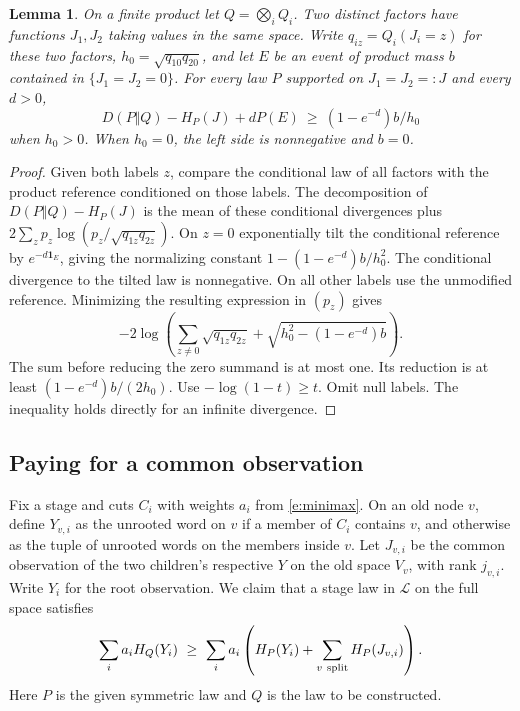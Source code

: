 \documentclass[11pt]{article}
\newtheorem{lemma}[theorem]{Lemma}
\numberwithin{equation}{section}
\newcommand{\one}{\mathbf 1}
\begin{document}
\begin{lemma}\label{l:tilt}
On a finite product let $Q=\bigotimes_i Q_i$. Two distinct factors
have functions $J_1,J_2$ taking values in the same space. Write
$q_{iz}=Q_i(J_i=z)$ for these two factors,
$h_0=\sqrt{q_{10}q_{20}}$, and let $E$ be an event of product mass
$b$ contained in $\{J_1=J_2=0\}$. For every law $P$ supported
on $J_1=J_2=:J$ and every $d>0$,
\[
 D(P\Vert Q)-H_P(J)+dP(E)
           \ \ge\ (1-e^{-d})b/h_0
\]
when $h_0>0$. When $h_0=0$, the left side is nonnegative and $b=0$.
\end{lemma}
\begin{proof}
Given both labels $z$, compare the conditional law of all factors
with the product reference conditioned on those labels. The
decomposition of $D(P\Vert Q)-H_P(J)$ is the mean of these
conditional divergences plus
$2\sum_z p_z\log(p_z/\sqrt{q_{1z}q_{2z}})$.
On $z=0$ exponentially tilt the conditional reference by
$e^{-d\one_E}$, giving the normalizing constant
$1-(1-e^{-d})b/h_0^2$. The conditional divergence to the
tilted law is nonnegative. On all other labels use the
unmodified reference. Minimizing the resulting expression in
$(p_z)$ gives
\[
 -2\log\left(\sum_{z\ne0}\sqrt{q_{1z}q_{2z}}
                  +\sqrt{h_0^2-(1-e^{-d})b}\right).
\]
The sum before reducing the zero summand is at most one. Its
reduction is at least $(1-e^{-d})b/(2h_0)$. Use
$-\log(1-t)\ge t$. Omit null labels. The inequality holds directly for an infinite
divergence.
\end{proof}

\subsection{Paying for a common observation}

Fix a stage and cuts $C_i$ with weights $a_i$ from
\eqref{e:minimax}. On an old node $v$, define $Y_{v,i}$ as
the unrooted word on $v$ if a member of $C_i$ contains $v$,
and otherwise as the tuple of unrooted words on the members
inside $v$. Let $J_{v,i}$ be the common observation of the
two children's respective $Y$ on the old space $V_v$, with rank
$j_{v,i}$. Write $Y_i$ for the root observation. We claim that
a stage law in $\mathcal L$ on the full space satisfies
\begin{equation}
 \sum_i a_i H_Q(Y_i)\ \ge\
       \sum_i a_i\left(H_P(Y_i)+\sum_{v\ {\rm split}}H_P(J_{v,i})\right).
 \label{e:comparison}
\end{equation}
Here $P$ is the given symmetric law and $Q$ is the law to be constructed.
\end{document}
